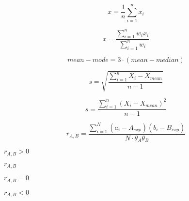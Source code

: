 \documentclass[10pt]{book}
\begin{document}
\begin{mdSnippets}
\begin{mdDisplaySnippet}[25995c91cf0f27787668183f89e9d097]%
\[%
  x = \frac{1}{n}\sum_{i=1}^n x_i
\]%
\end{mdDisplaySnippet}%
\begin{mdDisplaySnippet}[b30981c2c6c93f8351e35b7b03134a5d]%
\[%
x = \frac{\sum_{i=1}^n w_{i} x_{i}}{\sum_{i=1}^n w_i}
\]%
\end{mdDisplaySnippet}%
\begin{mdDisplaySnippet}[65e18aea13045e5f4be41d609f330d5b]%
\[%
  mean - mode = 3 \cdot (mean - median)
\]%
\end{mdDisplaySnippet}%
\begin{mdDisplaySnippet}[007284d06eded727e0cc1bb33f8ee74b]%
\[%
s = \sqrt{ \frac{\sum_{i=1}^n X_i - X_{mean}}{n - 1}}
\]%
\end{mdDisplaySnippet}%
\begin{mdDisplaySnippet}[ec606a64060aad783719df67e1278db8]%
\[%
  s = \frac{\sum_{i=1}^n (X_i - X_{mean})^2}{n - 1}
\]%
\end{mdDisplaySnippet}%
\begin{mdDisplaySnippet}[2ce6975c1e7fd0bdc65da17b29cf838a]%
\[%
  r_{A,B} = \frac{\sum_{i=1}^N (a_i - A_{exp})(b_i - B_{exp})}{N \cdot \theta_A \theta_B}
\]%
\end{mdDisplaySnippet}%
\begin{mdInlineSnippet}%
$r_{A,B} > 0$\end{mdInlineSnippet}%
\begin{mdInlineSnippet}[f8e53115274df3019cd9995865d4a9f5]%
$r_{A,B}$\end{mdInlineSnippet}%
\begin{mdInlineSnippet}[2a4a24f3ea165f2b784bd7aefed4e536]%
$r_{A,B} = 0$\end{mdInlineSnippet}%
\begin{mdInlineSnippet}[ab500f6633e18c633c845dd12967b033]%
$r_{A,B} < 0$\end{mdInlineSnippet}%
\begin{mdDisplaySnippet}%

\end{mdDisplaySnippet}
\end{mdSnippets}
\end{document}
